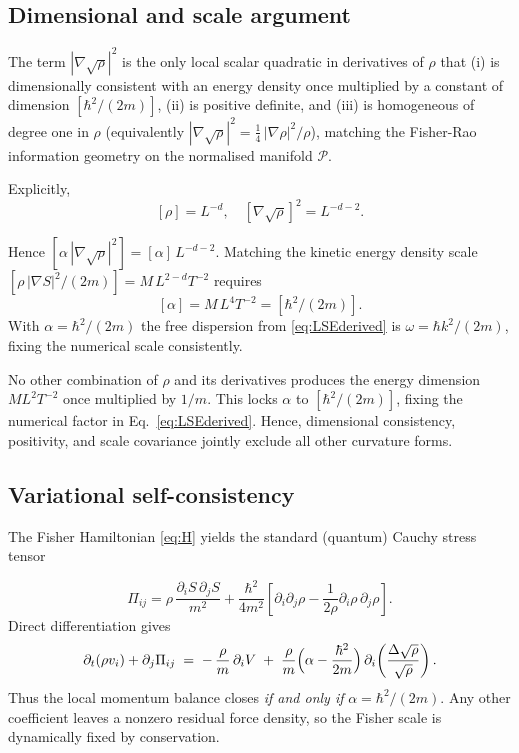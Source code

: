 \documentclass[11pt,a4paper]{article}
\numberwithin{equation}{section}
\theoremstyle{thmcompact}
\theoremstyle{remark}
\begin{document}
\subsection{Dimensional and scale argument}
	
The term $|\nabla\sqrt\rho|^2$ is the only local scalar quadratic in derivatives of $\rho$ that (i) is dimensionally consistent with an energy density once multiplied by a constant of dimension $[\hbar^2/(2m)]$, (ii) is positive definite, and (iii) is homogeneous of degree one in $\rho$ (equivalently $|\nabla\sqrt\rho|^2=\tfrac{1}{4}\,|\nabla\rho|^2/\rho$), matching the Fisher-Rao information geometry on the normalised manifold $\mathcal P$.

	Explicitly,
	\[
	[\rho]=L^{-d},\quad [\nabla\sqrt\rho]^2=L^{-d-2}.
	\]
	
	Hence $[\alpha\,|\nabla\sqrt\rho|^{2}]=[\alpha]\,L^{-d-2}$. Matching the kinetic energy density scale $[\rho\,|\nabla S|^{2}/(2m)]=M\,L^{2-d}T^{-2}$ requires
	\[
	[\alpha]=M\,L^{4}T^{-2}=[\hbar^{2}/(2m)].
	\]
	With $\alpha=\hbar^{2}/(2m)$ the free dispersion from \eqref{eq:LSEderived} is $\omega=\hbar k^{2}/(2m)$, fixing the numerical scale consistently.
		
	No other combination of $\rho$ and its derivatives produces the energy dimension $ML^2T^{-2}$ once multiplied by $1/m$.
	This locks $\alpha$ to $[\hbar^2/(2m)]$, fixing the numerical factor in Eq.~\eqref{eq:LSEderived}.
	Hence, dimensional consistency, positivity, and scale covariance jointly exclude all other curvature forms.
	
	\subsection{Variational self-consistency}
	
	The Fisher Hamiltonian \eqref{eq:H} yields the standard (quantum) Cauchy stress tensor

	\[
	\Pi_{ij}=\rho\,\frac{\partial_i S\,\partial_j S}{m^2}
	+\frac{\hbar^2}{4m^2}\left[\partial_i\partial_j\rho-\frac{1}{2\rho}\partial_i\rho\,\partial_j\rho\right].
	\]
	Direct differentiation gives
\[
\partial_t(\rho v_i)+\partial_j \Pi_{ij} \;=\; -\,\frac{\rho}{m}\,\partial_i V
\;+\;\frac{\rho}{m}\Bigl(\alpha-\frac{\hbar^{2}}{2m}\Bigr)\,\partial_i\!\left(\frac{\Delta\sqrt\rho}{\sqrt\rho}\right).
\]
Thus the local momentum balance closes \emph{if and only if} $\alpha=\hbar^{2}/(2m)$. Any other coefficient leaves a nonzero residual force density, so the Fisher scale is dynamically fixed by conservation.
\end{document}
